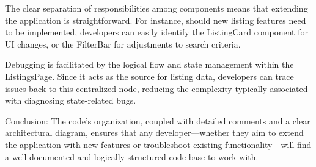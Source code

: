 \documentclass[10pt,twocolumn]{article}
\begin{document}
The clear separation of responsibilities among components means that extending the application is straightforward. For instance, should new listing features need to be implemented, developers can easily identify the ListingCard component for UI changes, or the FilterBar for adjustments to search criteria.

Debugging is facilitated by the logical flow and state management within the ListingsPage. Since it acts as the source for listing data, developers can trace issues back to this centralized node, reducing the complexity typically associated with diagnosing state-related bugs.

Conclusion:
The code's organization, coupled with detailed comments and a clear architectural diagram, ensures that any developer—whether they aim to extend the application with new features or troubleshoot existing functionality—will find a well-documented and logically structured code base to work with. 
\clearpage
\printbibliography
\end{document}
